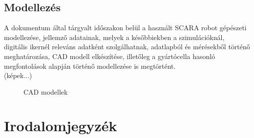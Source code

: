 \documentclass{article}
\begin{document}
\subsection{Modellezés}
A dokumentum által tárgyalt időszakon belül a használt SCARA robot gépészeti modellezése, jellemző adatainak, melyek
a későbbiekben a szimulációknál, digitális ikernél releváns adatként szolgálhatnak, adatlapból és mérésekből történő 
meghatározása, CAD modell elkészítése, illetőleg a gyártócella hasonló megfontolások alapján történő modellezése 
is megtörtént.\\
(képek...)
\begin{figure}[h]
    \centering
    \caption{CAD modellek}
\end{figure}


\section{Irodalomjegyzék}
\end{document}
